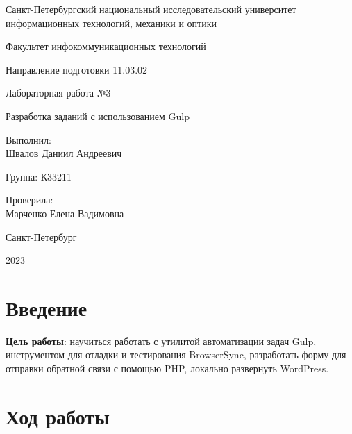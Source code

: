 \documentclass[a4paper, 14pt]{extarticle}
\begin{document}
\begin{titlepage}
  \vspace{0pt plus2fill}
  \noindent

  \vspace{0pt plus6fill}
  \begin{center}
    Санкт-Петербургский национальный исследовательский университет
    информационных технологий, механики и оптики

    \vspace{0pt plus3fill}

    Факультет инфокоммуникационных технологий

    Направление подготовки 11.03.02

    \vspace{0pt plus2fill}

    Лабораторная работа №3

    Разработка заданий с использованием Gulp

  \end{center}

  \vspace{0pt plus9fill}
  \begin{flushright}
    Выполнил: \\
    Швалов Даниил Андреевич

    Группа: К33211

    Проверила: \\
    Марченко Елена Вадимовна
  \end{flushright}

  \vspace{0pt plus2fill}
  \begin{center}
    Санкт-Петербург

    2023
  \end{center}
\end{titlepage}

\section{Введение}

\textbf{Цель работы}: научиться работать с утилитой автоматизации задач Gulp,
инструментом для отладки и тестирования BrowserSync, разработать форму для
отправки обратной связи с помощью PHP, локально развернуть WordPress.

\section{Ход работы}
\end{document}
